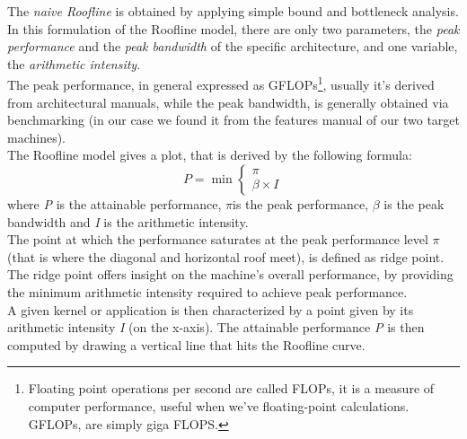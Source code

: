 	
	The \textit{naive Roofline} is obtained by applying simple bound and bottleneck analysis.
	In this formulation of the Roofline model, there are only two parameters, the \textit{peak performance} and the \textit{peak bandwidth} of the specific architecture, and one variable, the \textit{arithmetic intensity}.\\
	The peak performance, in general expressed as GFLOPs\footnote{Floating point operations per second are called FLOPs, it is a measure of computer performance, useful when we've floating-point calculations. GFLOPs, are simply giga FLOPS.}, usually it's derived from architectural manuals, while the peak bandwidth, is generally obtained via benchmarking\cite{rooflinepaper} (in our case we found it from the features manual of our two target machines).\\
	The Roofline model gives a plot, that is derived by the following formula:
	\begin{equation}
		P=\min {\begin{cases}\pi \\\beta \times I\end{cases}}
	\end{equation}	
	where \textit{P} is the attainable performance, \(\pi\)is the peak performance, \(\beta\) is the peak bandwidth and \textit{I} is the arithmetic intensity\cite{applyroofline}.\\
	The point at which the performance saturates at the peak performance level \(\pi\) (that is where the diagonal and horizontal roof meet), is defined as ridge point.\\
	The ridge point offers insight on the machine's overall performance, by providing the minimum arithmetic intensity required to achieve peak performance.\\	
	A given kernel or application is then characterized by a point given by its arithmetic intensity \textit{I} (on the x-axis). The attainable performance \textit{P} is then computed by drawing a vertical line that hits the Roofline curve.\\
	
